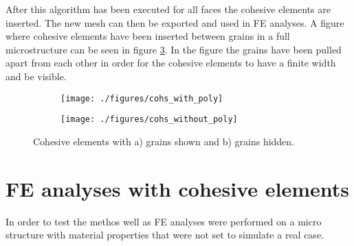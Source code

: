 \documentclass[grain_boundary_law.tex]{subfiles}
\begin{document}
After this algorithm has been executed for all faces the cohesive elements are inserted. The new mesh can then be exported and used in FE analyses. A figure where cohesive elements have been inserted between grains in a full microstructure can be seen in figure \ref{fig:cohs_large}. In the figure the grains have been pulled apart from each other in order for the cohesive elements to have a finite width and be visible.



\begin{figure}[htpb!]
\centering
\begin{subfigure}[b]{.5\textwidth}
  \centering
  \texttt{[image: ./figures/cohs\_with\_poly]}
  \caption{}
  \label{fig:cohs_large_a}
\end{subfigure}%
\begin{subfigure}[b]{.5\textwidth}
  \centering
  \texttt{[image: ./figures/cohs\_without\_poly]}
  \caption{}
  \label{fig:cohs_large_b}
\end{subfigure}
\caption{Cohesive elements with a) grains shown and b) grains hidden.}
\label{fig:cohs_large}
\end{figure}


\section{FE analyses with cohesive elements}

In order to test the methos well as FE analyses were performed on a micro structure with material properties that were not set to simulate a real case.
\end{document}
